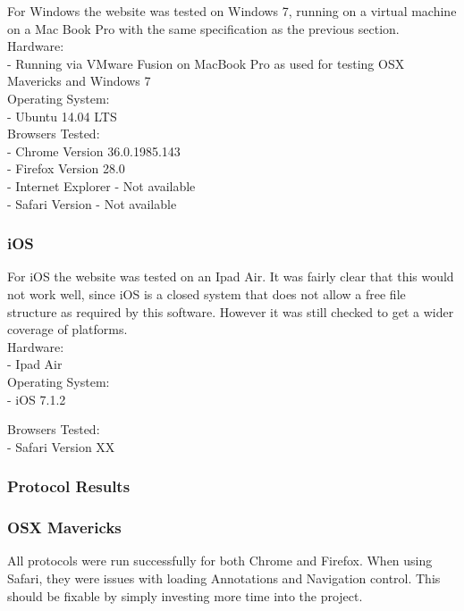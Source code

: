 \documentclass[a4paper,11pt,twoside]{article}
\begin{document}
For Windows the website was tested on Windows 7, running on a virtual machine on a Mac Book Pro with the same specification as the previous section.\\

\noindent Hardware:\\
- Running via VMware Fusion on MacBook Pro as used for testing OSX Mavericks and Windows 7\\

\noindent Operating System:\\
- Ubuntu 14.04 LTS\\

\noindent Browsers Tested:\\
- Chrome Version 36.0.1985.143\\
- Firefox Version 28.0\\
- Internet Explorer - Not available\\
- Safari Version - Not available


\subsubsection*{iOS}

For iOS the website was tested on an Ipad Air. It was fairly clear that this would not work well, since iOS is a closed system that does not allow a free file structure as required by this software. However it was still checked to get a wider coverage of platforms.\\

\noindent Hardware:\\
- Ipad Air\\

\noindent Operating System:\\
- iOS 7.1.2

\noindent Browsers Tested:\\
- Safari Version XX



\subsubsection{Protocol Results}

\subsubsection*{OSX Mavericks}

All protocols were run successfully for both Chrome and Firefox. When using Safari, they were issues with loading Annotations and Navigation control. This should be fixable by simply investing more time into the project.\\
\end{document}
